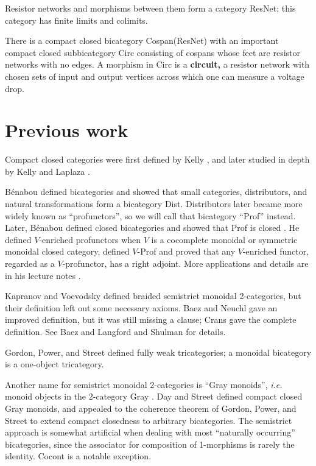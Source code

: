 \documentclass{article}
\begin{document}
\begin{itemize}
    Resistor networks and morphisms between them form a category ResNet; this category has finite limits and colimits.
    
    There is a compact closed bicategory Cospan(ResNet) with an important compact closed subbicategory Circ consisting of cospans whose feet are resistor networks with no edges.  A morphism in Circ is a {\bf circuit,} a resistor network with chosen sets of input and output vertices across which one can measure a voltage drop.
\end{itemize}

\section{Previous work}
\label{previous}

Compact closed categories were first defined by Kelly \cite{KellyCC}, and later studied in depth by Kelly and Laplaza \cite{KellyLaplaza}.

B\'enabou \cite{Ben67} defined bicategories and showed that small categories, distributors, and natural transformations form a bicategory Dist.  Distributors later became more widely known as ``profunctors'', so we will call that bicategory ``Prof'' instead.  Later, B\'enabou defined closed bicategories and showed that Prof is closed  \cite
{Ben73}.  He defined $V$-enriched profunctors when $V$ is a cocomplete monoidal or symmetric monoidal closed category, defined $V$-Prof and proved that any $V$-enriched functor, regarded as a $V$-profunctor, has a right adjoint.  More applications and details are in his lecture notes
\cite{Ben00}.

Kapranov and Voevodsky \cite{KV94} defined braided semistrict monoidal 2-categories, but their definition left out some necessary axioms.  Baez and Neuchl \cite{HDA1} gave an improved definition, but it was still missing a clause; Crans \cite{Crans} gave the complete definition.  See Baez and Langford \cite{HDA4} and Shulman \cite{Shulman} for details.

Gordon, Power, and Street \cite{GPS} defined fully weak tricategories; a monoidal bicategory is a one-object tricategory.

Another name for semistrict monoidal 2-categories is ``Gray monoids'', {\em i.e.} monoid objects in the 2-category Gray \cite{Gray}.  Day and Street \cite{DS97} defined compact closed Gray monoids, and appealed to the coherence theorem of Gordon, Power, and Street to extend compact closedness to arbitrary bicategories.  The semistrict approach is somewhat artificial when dealing with most ``naturally occurring'' bicategories, since the associator for composition of 1-morphisms is rarely the identity.  Cocont is a notable exception.
\end{document}
